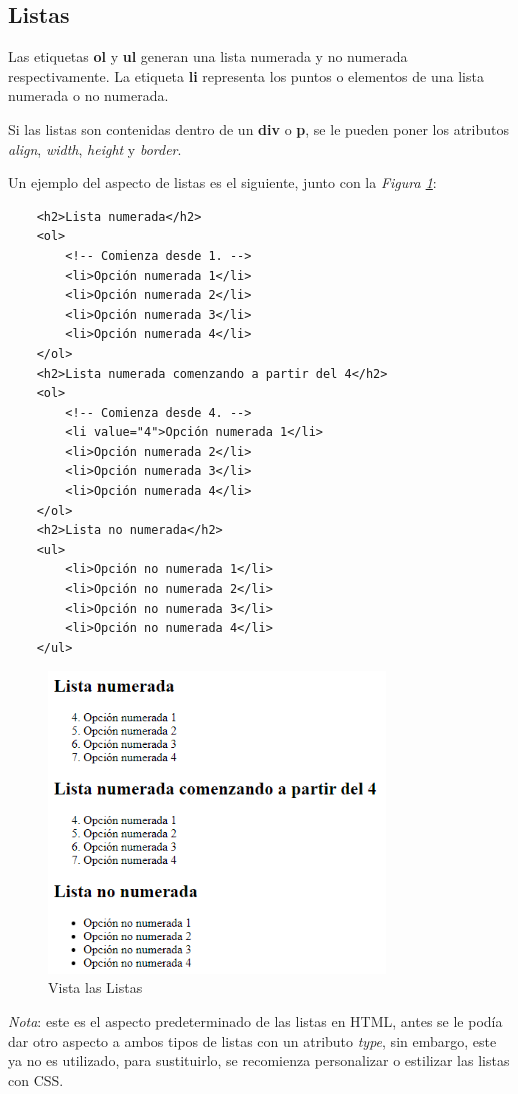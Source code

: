 \subsection{Listas}

Las etiquetas \textbf{ol} y \textbf{ul} generan una lista numerada y no numerada respectivamente. La etiqueta \textbf{li} representa los puntos o elementos de una lista numerada o no numerada.

Si las listas son contenidas dentro de un \textbf{div} o \textbf{p}, se le pueden poner los atributos \textit{align}, \textit{width}, \textit{height} y \textit{border}.

Un ejemplo del aspecto de listas es el siguiente, junto con la \textit{Figura \ref{fig: 4}}:
\begin{lstlisting}
    <h2>Lista numerada</h2>
    <ol>
        <!-- Comienza desde 1. -->
        <li>Opción numerada 1</li>
        <li>Opción numerada 2</li>
        <li>Opción numerada 3</li>
        <li>Opción numerada 4</li>
    </ol>
    <h2>Lista numerada comenzando a partir del 4</h2>
    <ol>
        <!-- Comienza desde 4. -->
        <li value="4">Opción numerada 1</li>
        <li>Opción numerada 2</li>
        <li>Opción numerada 3</li>
        <li>Opción numerada 4</li>
    </ol>
    <h2>Lista no numerada</h2>
    <ul>
        <li>Opción no numerada 1</li>
        <li>Opción no numerada 2</li>
        <li>Opción no numerada 3</li>
        <li>Opción no numerada 4</li>
    </ul>
\end{lstlisting}
\begin{figure}[H]
    \centering
    \caption{Vista las Listas}
    \label{fig: 4}
    \includegraphics[height=8cm]{ss_html/listas.png}
\end{figure}

\textit{Nota}: este es el aspecto predeterminado de las listas en HTML, antes se le podía dar otro aspecto a ambos tipos de listas con un atributo \textit{type}, sin embargo, este ya no es utilizado, para sustituirlo, se recomienza personalizar o estilizar las listas con CSS.


